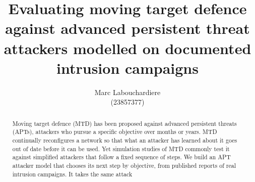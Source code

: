 \documentclass{cshonours}
\title{Evaluating moving target defence against advanced persistent
       threat attackers modelled on documented intrusion campaigns}
\author{Marc Labouchardiere \\ \normalsize\upshape (23857377)}
\begin{document}

\maketitle

\begin{abstract}
%
Moving target defence (MTD) has been proposed against advanced persistent
threats (APTs), attackers who pursue a specific objective over months or
years. MTD continually reconfigures a network so that what an attacker has
learned about it goes out of date before it can be used. Yet simulation
studies of MTD commonly test it against simplified attackers that follow a
fixed sequence of steps.
We build an APT attacker model that chooses its next step by objective, from
published reports of real intrusion campaigns. It takes the same attack

\end{abstract}
\end{document}
